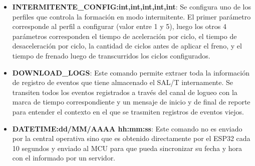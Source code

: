 \begin{itemize}
    \item \textbf{INTERMITENTE\_CONFIG:int,int,int,int,int}: Se configura uno de los perfiles que controla la formación en modo intermitente. El primer parámetro corresponde al perfil a configurar (valor entre 1 y 5), luego los otros 4 parámetros corresponden el tiempo de aceleración por ciclo, el tiempo de desaceleración por ciclo, la cantidad de ciclos antes de aplicar el freno, y el tiempo de frenado luego de transcurridos los ciclos configurados. 
    
    \item \textbf{DOWNLOAD\_LOGS}: Este comando permite extraer toda la información de registro de eventos que tiene almacenado el SAL/T internamente. Se transiten todos los eventos registrados a través del canal de logueo con la marca de tiempo correspondiente y un mensaje de inicio y de final de reporte para entender el contexto en el que se trasmiten registros de eventos viejos. 
    
    \item \textbf{DATETIME:dd/MM/AAAA hh:mm:ss}: Este comando no es enviado por la central operativa sino que es obtenido directamente por el ESP32 cada 10 segundos y enviado al MCU para que pueda sincronizar su fecha y hora con el informado por un servidor. 


\end{itemize}

